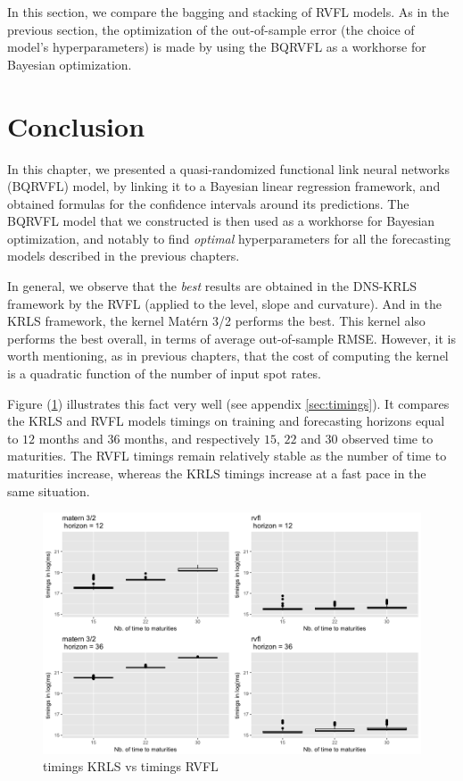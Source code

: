 In this section, we compare the bagging and stacking of RVFL models. As in the previous section, the optimization of the out-of-sample error (the choice of model's hyperparameters) is made by using the BQRVFL as a workhorse for Bayesian optimization. 

\section{Conclusion}

In this chapter, we presented a quasi-randomized functional link neural networks (BQRVFL) model, by linking it to a Bayesian linear regression framework, and obtained formulas for the confidence intervals around its predictions. The BQRVFL model that we constructed is then used as a workhorse for Bayesian optimization, and notably to find \textit{optimal} hyperparameters for all the forecasting models described in the previous chapters.

In general, we observe that the \textit{best} results are obtained in the DNS-KRLS framework by the RVFL (applied to the level, slope and curvature). And in the KRLS framework, the kernel Mat\'ern 3/2 performs the best. This kernel also performs the best overall, in terms of average out-of-sample RMSE. However, it is worth mentioning, as in previous chapters, that the cost of computing the kernel is a quadratic function of the number of input spot rates. 

Figure (\ref{timings}) illustrates this fact very well (see appendix \ref{sec:timings}). It compares the KRLS and RVFL models timings on training and forecasting horizons equal to $12$ months and $36$ months, and respectively $15$, $22$ and $30$ observed time to maturities. The RVFL timings remain relatively stable as the number of time to maturities increase, whereas the KRLS timings increase at a fast pace in the same situation.

\begin{figure}[!htb]
\centering
\includegraphics[width=13cm]{gfx/chapter-bayesianrvfl/timings.png}
\caption{timings KRLS vs timings RVFL}
\label{timings}
\end{figure}

